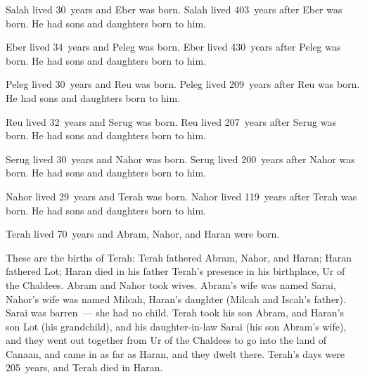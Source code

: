 \begin{inparaenum}
   Salah lived 30~years and Eber was born.%
   Salah lived 403~years after Eber was born. He had sons and daughters born to him.%

   Eber lived 34~years and Peleg was born.%
   Eber lived 430~years after Peleg was born. He had sons and daughters born to him.%

   Peleg lived 30~years and Reu was born.%
   Peleg lived 209~years after Reu was born. He had sons and daughters born to him.%

   Reu lived 32~years and Serug was born.%
   Reu lived 207~years after Serug was born. He had sons and daughters born to him.%

   Serug lived 30~years and Nahor was born.%
   Serug lived 200~years after Nahor was born. He had sons and daughters born to him.%

   Nahor lived 29~years and Terah was born.%
   Nahor lived 119~years after Terah was born. He had sons and daughters born to him.%

   Terah lived 70~years and Abram, Nahor, and Haran were born.%

   These are the births of Terah: Terah fathered Abram, Nahor, and Haran; Haran fathered Lot;%
   Haran died in his father Terah's presence in his birthplace, Ur of the Chaldees.%
   Abram and Nahor took wives. Abram's wife was named Sarai, Nahor's wife was named Milcah, Haran's daughter (Milcah and Iscah's father).%
   Sarai was barren~--- she had no child.%
   Terah took his son Abram, and Haran's son Lot (his grandchild), and his daughter-in-law Sarai (his son Abram's wife), and they went out together from Ur of the Chaldees to go into the land of Canaan, and came in as far as Haran, and they dwelt there.%
   Terah's days were 205~years, and Terah died in Haran.%
\end{inparaenum}
